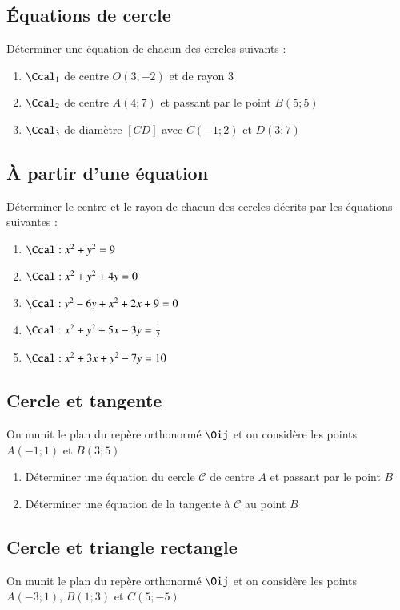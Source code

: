 \documentclass[oneside,12pt]{article}          %
\begin{document}
\subsection{Équations de cercle}
Déterminer une équation de chacun des cercles suivants :
\begin{enumerate}
    \item $\Ccal_1$ de centre $O(3,-2)$ et de rayon 3
    \item $\Ccal_2$ de centre $A(4;7)$ et passant par le point $B(5;5)$
    \item $\Ccal_3$ de diamètre $[CD]$ avec $C(-1;2)$ et $D(3;7)$
\end{enumerate}



\subsection{À partir d'une équation}
Déterminer le centre et le rayon de chacun des cercles décrits par les équations suivantes :
\begin{enumerate}
	\item $\Ccal : x^2+y^2=9$
	\item $\Ccal : x^2+y^2+4y=0$
	\item $\Ccal : y^2-6y+x^2+2x+9=0$
	\item $\Ccal : x^2+y^2+5x-3y=\frac{1}{2}$
	\item $\Ccal : x^2+3x+y^2-7y=10$
\end{enumerate}



\subsection{Cercle et tangente}
On munit le plan du repère orthonormé $\Oij$ et on considère les points $A(-1;1)$ et $B(3;5)$
\begin{enumerate}
    \item Déterminer une équation du cercle $\mathscr{C}$ de centre $A$ et passant par le point $B$
    \item Déterminer une équation de la tangente à $\mathscr{C}$ au point $B$
\end{enumerate}



\subsection{Cercle et triangle rectangle}
On munit le plan du repère orthonormé $\Oij$ et on considère les points $A(-3;1)$, $B(1;3)$ et $C(5;-5)$
\end{document}
